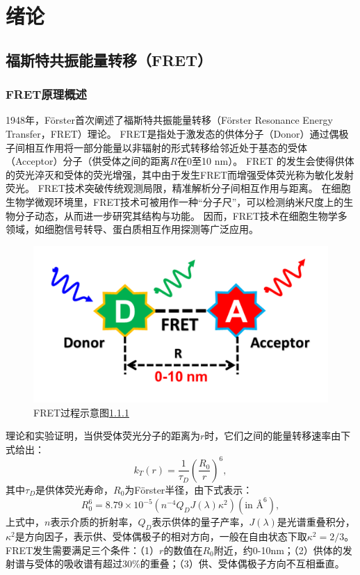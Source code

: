 \chapter{绪论}

\section{福斯特共振能量转移（FRET）}

\subsection{FRET原理概述}
1948年，Förster首次阐述了福斯特共振能量转移（Förster Resonance Energy Transfer，FRET）理论。
FRET是指处于激发态的供体分子（Donor）通过偶极子间相互作用将一部分能量以非辐射的形式转移给邻近处于基态的受体（Acceptor）分子（供受体之间的距离$R$在0至10 nm）。
FRET 的发生会使得供体的荧光淬灭和受体的荧光增强，其中由于发生FRET而增强受体荧光称为敏化发射荧光。
FRET技术突破传统观测局限，精准解析分子间相互作用与距离。
在细胞生物学微观环境里，FRET技术可被用作一种“分子尺”，可以检测纳米尺度上的生物分子动态，从而进一步研究其结构与功能。
因而，FRET技术在细胞生物学多领域，如细胞信号转导、蛋白质相互作用探测等广泛应用。
\begin{figure}[htbp]
    \centering
    \includegraphics[width=0.5\linewidth]{../figures/1/1_FRET过程示意图.png}
    \caption{FRET过程示意图\ref{}}
    \label{fig:fret}
\end{figure}

理论和实验证明，当供受体荧光分子的距离为$r$时，它们之间的能量转移速率由下式给出：
\begin{equation}
    k_T(r)=\frac{1}{\tau_D}(\frac{R_0}{r})^6, \label{eq:1-1}
\end{equation}
其中$\tau_D$是供体荧光寿命，$R_0$为Förster半径，由下式表示：
\begin{equation}
    R_0^6=8.79\times{10^{-5}}(n^{-4}Q_DJ(\lambda)\kappa^2)(\text{in~} \mbox{\AA}^6),
\end{equation}
上式中，$n$表示介质的折射率，$Q_D$表示供体的量子产率，$J(\lambda)$是光谱重叠积分，$\kappa^2$是方向因子，表示供、受体偶极子的相对方向，一般在自由状态下取$\kappa^2=2/3$。FRET发生需要满足三个条件：（1）$r$的数值在$R_0$附近，约0-10nm；（2）供体的发射谱与受体的吸收谱有超过30\%的重叠；（3）供、受体偶极子方向不互相垂直。

